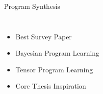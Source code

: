 \documentclass[aspectratio=169]{beamer}
\makeatletter
\renewcommand{\emph}[1]{{\Huge \color{pureminimalistic@text@red} #1}}
\newcommand{\white}[1]{{\color{pureminimalistic@text@white} #1}}
\makeatother
\begin{document}
\begin{frame}[plain]{\white{Program Synthesis}}
\begin{columns}[T]
\begin{column}{.5\linewidth}
\begin{figure}
          \end{figure}
      \end{column}
  \end{columns}
\end{frame}

\begin{frame}[plain]{}
  
  \begin{columns}[T]
      \begin{column}{.5\linewidth}
          \vspace{1em}
          \emph{\cite{gulwani2017program}}
          \begin{itemize}
              \item Best Survey Paper
          \end{itemize}
          \vspace{1em}
          \emph{\cite{lake2015human}}
          \begin{itemize}
              \item Bayesian Program Learning
          \end{itemize}
          \vspace{1em}
          \emph{\cite{real2020automl}}
          \begin{itemize}
              \item Tensor Program Learning 
              \item Core Thesis Inspiration 
          \end{itemize}
      \end{column}
      \begin{column}{.5\linewidth}
          \begin{figure}
              \vspace{-0.5em}
              \hspace*{1.3em}

\end{figure}
\end{column}
\end{columns}
\end{frame}
\end{document}
